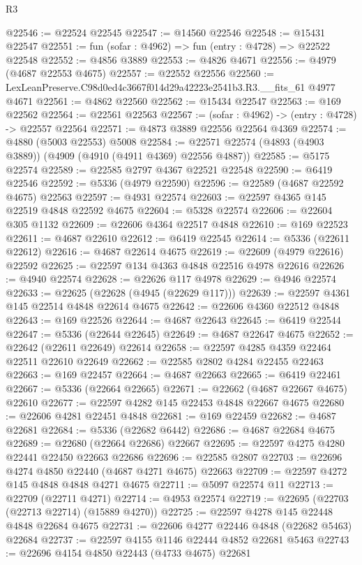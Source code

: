 \begin{lexlean}{R3}
\begin{coremodule}
@22546 := @22524 @22545
@22547 := @14560 @22546
@22548 := @15431 @22547
@22551 := fun (sofar : @4962) => fun (entry : @4728) => @22522 @22548
@22552 := @4856 @3889
@22553 := @4826 @4671
@22556 := @4979 (@4687 @22553 @4675)
@22557 := @22552 @22556
@22560 := LexLeanPreserve.C98d0ed4c3667f014d29a42223e2541b3.R3.__fits_61 @4977 @4671
@22561 := @4862 @22560
@22562 := @15434 @22547
@22563 := @169 @22562
@22564 := @22561 @22563
@22567 := (sofar : @4962) -> (entry : @4728) -> @22557 @22564
@22571 := @4873 @3889 @22556 @22564 @4369
@22574 := @4880 (@5003 @22553) @5008
@22584 := @22571 @22574 (@4893 (@4903 @3889)) (@4909 (@4910 (@4911 @4369) @22556 @4887))
@22585 := @5175 @22574
@22589 := @22585 @2797 @4367 @22521 @22548
@22590 := @6419 @22546
@22592 := @5336 (@4979 @22590)
@22596 := @22589 (@4687 @22592 @4675) @22563
@22597 := @4931 @22574
@22603 := @22597 @4365 @145 @22519 @4848 @22592 @4675
@22604 := @5328 @22574
@22606 := @22604 @305 @1132
@22609 := @22606 @4364 @22517 @4848
@22610 := @169 @22523
@22611 := @4687 @22610
@22612 := @6419 @22545
@22614 := @5336 (@22611 @22612)
@22616 := @4687 @22614 @4675
@22619 := @22609 (@4979 @22616) @22592
@22625 := @22597 @134 @4363 @4848 @22516 @4978 @22616
@22626 := @4940 @22574
@22628 := @22626 @117 @4978
@22629 := @4946 @22574
@22633 := @22625 (@22628 (@4945 (@22629 @117)))
@22639 := @22597 @4361 @145 @22514 @4848 @22614 @4675
@22642 := @22606 @4360 @22512 @4848
@22643 := @169 @22526
@22644 := @4687 @22643
@22645 := @6419 @22544
@22647 := @5336 (@22644 @22645)
@22649 := @4687 @22647 @4675
@22652 := @22642 (@22611 @22649) @22614
@22658 := @22597 @4285 @4359 @22464 @22511 @22610 @22649
@22662 := @22585 @2802 @4284 @22455 @22463
@22663 := @169 @22457
@22664 := @4687 @22663
@22665 := @6419 @22461
@22667 := @5336 (@22664 @22665)
@22671 := @22662 (@4687 @22667 @4675) @22610
@22677 := @22597 @4282 @145 @22453 @4848 @22667 @4675
@22680 := @22606 @4281 @22451 @4848
@22681 := @169 @22459
@22682 := @4687 @22681
@22684 := @5336 (@22682 @6442)
@22686 := @4687 @22684 @4675
@22689 := @22680 (@22664 @22686) @22667
@22695 := @22597 @4275 @4280 @22441 @22450 @22663 @22686
@22696 := @22585 @2807
@22703 := @22696 @4274 @4850 @22440 (@4687 @4271 @4675) @22663
@22709 := @22597 @4272 @145 @4848 @4848 @4271 @4675
@22711 := @5097 @22574 @11
@22713 := @22709 (@22711 @4271)
@22714 := @4953 @22574
@22719 := @22695 (@22703 (@22713 @22714) (@15889 @4270))
@22725 := @22597 @4278 @145 @22448 @4848 @22684 @4675
@22731 := @22606 @4277 @22446 @4848 (@22682 @5463) @22684
@22737 := @22597 @4155 @1146 @22444 @4852 @22681 @5463
@22743 := @22696 @4154 @4850 @22443 (@4733 @4675) @22681

\end{coremodule}
\end{lexlean}

